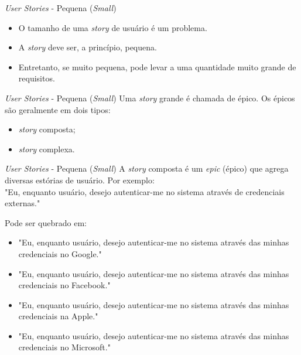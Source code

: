 \documentclass[11pt]{beamer}
\begin{document}
   \begin{frame}{\textit{User Stories} - Pequena (\textit{Small})}
      \begin{itemize}
         \item O tamanho de uma \textit{story} de usuário é um problema.
         \item A \textit{story} deve ser, a princípio, pequena.
         \item Entretanto, se muito pequena, pode levar a uma quantidade muito grande de requisitos.
      \end{itemize}
   \end{frame}

   \begin{frame}{\textit{User Stories} - Pequena (\textit{Small})}
      Uma \textit{story} grande é chamada de épico. Os épicos são geralmente em dois tipos:
      \begin{itemize}
         \item \textit{story} composta;
         \item \textit{story} complexa.
      \end{itemize}
   \end{frame}

   \begin{frame}{\textit{User Stories} - Pequena (\textit{Small})}
      A \textit{story} composta é um \textit{epic} (épico) que agrega diversas estórias de usuário. Por exemplo:\\

      "Eu, enquanto usuário, desejo autenticar-me no sistema através de credenciais externas."
\vspace{1cm}       

      Pode ser quebrado em:
      \begin{itemize}
         \item "Eu, enquanto usuário, desejo autenticar-me no sistema através das minhas credenciais no Google."
         \item "Eu, enquanto usuário, desejo autenticar-me no sistema através das minhas credenciais no Facebook."
         \item "Eu, enquanto usuário, desejo autenticar-me no sistema através das minhas credenciais na Apple."
         \item "Eu, enquanto usuário, desejo autenticar-me no sistema através das minhas credenciais no Microsoft."
      \end{itemize}
   \end{frame}
\end{document}
